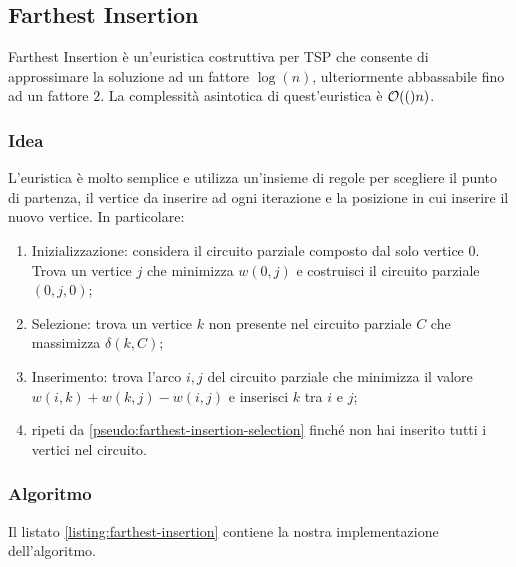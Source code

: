 \newpage

\subsection{Farthest Insertion}

Farthest Insertion è un'euristica costruttiva per TSP che consente di
approssimare la soluzione ad un fattore $\log(n)$, ulteriormente
abbassabile fino ad un fattore $2$. La complessità asintotica di
quest'euristica è $\mathcal{O}(()n)$.

\subsubsection{Idea}

L'euristica è molto semplice e utilizza un'insieme di regole per
scegliere il punto di partenza, il vertice da inserire ad ogni
iterazione e la posizione in cui inserire il nuovo vertice. In
particolare:

\begin{enumerate}
    \item Inizializzazione: considera il circuito parziale composto
      dal solo vertice $0$. Trova un vertice $j$ che minimizza $w(0,
      j)$ e costruisci il circuito parziale $(0, j,0)$;
    \item Selezione: trova un vertice $k$ non presente nel circuito
      parziale $C$ che massimizza $\delta(k,C)$;
    \label{pseudo:farthest-insertion-selection}
    \item Inserimento: trova l’arco ${i, j}$ del circuito parziale che
      minimizza il valore $w(i, k) + w(k, j) - w(i, j)$ e inserisci
      $k$ tra $i$ e $j$;
    \item ripeti da \ref{pseudo:farthest-insertion-selection} finché
      non hai inserito tutti i vertici nel circuito.
\end{enumerate}

\subsubsection{Algoritmo}

\noindent Il listato \ref{listing:farthest-insertion} contiene la
nostra implementazione dell'algoritmo.

